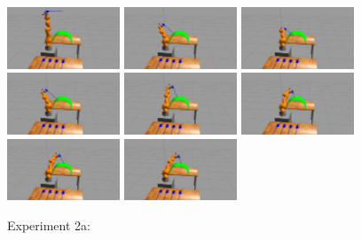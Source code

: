 \begin{center}
\begin{figure}[H]
\centering
\includegraphics[width=0.3\textwidth]{images/robot_planner2/robot_planner2_1}
\includegraphics[width=0.3\textwidth]{images/robot_planner2/robot_planner2_2}
\includegraphics[width=0.3\textwidth]{images/robot_planner2/robot_planner2_3}\\
\includegraphics[width=0.3\textwidth]{images/robot_planner2/robot_planner2_4}
\includegraphics[width=0.3\textwidth]{images/robot_planner2/robot_planner2_5}
\includegraphics[width=0.3\textwidth]{images/robot_planner2/robot_planner2_6}\\
\includegraphics[width=0.3\textwidth]{images/robot_planner2/robot_planner2_7}
\includegraphics[width=0.3\textwidth]{images/robot_planner2/robot_planner2_8}\\
\caption{Experiment 2a:}
\label{experiment-robot-planner2a}
\end{figure}
\end{center}

